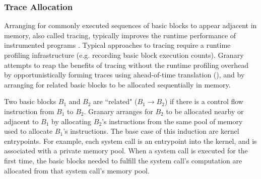 \documentclass[preprint]{sigplanconf}
\begin{document}





\subsubsection{Trace Allocation}
Arranging for commonly executed sequences of basic blocks to appear adjacent in memory, also called tracing, typically improves the runtime performance of instrumented programs \cite{DynamoRIO}. Typical approaches to tracing require a runtime profiling infrastructure (e.g. recording basic block execution counts). Granary attempts to reap the benefits of tracing without the runtime profiling overhead by opportunistically forming traces using ahead-of-time translation (), and by arranging for related basic blocks to be allocated sequentially in memory.

Two basic blocks $B_1$ and $B_2$ are ``related" ($B_1 \to B_2$) if there is a control flow instruction from $B_1$ to $B_2$. Granary arranges for $B_2$ to be allocated nearby or adjacent to $B_1$ by allocating $B_2$'s instructions from the same pool of memory used to allocate $B_1$'s instructions. The base case of this induction are kernel entrypoints. For example, each system call is an entrypoint into the kernel, and is associated with a private memory pool. When a system call is executed for the first time, the basic blocks needed to fulfill the system call's computation are allocated from that system call's memory pool.
\end{document}
